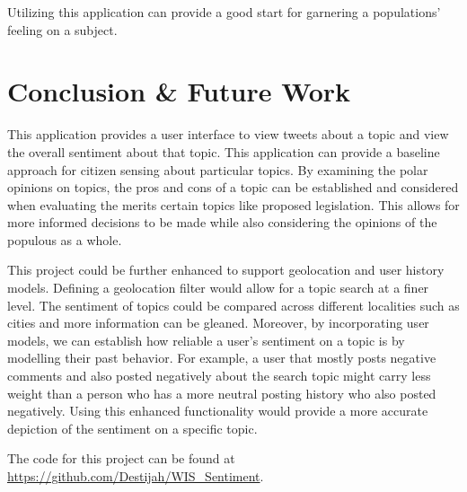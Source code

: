 Utilizing this application can provide a good start for garnering a populations' feeling on a subject. 

\section{Conclusion \& Future Work}
This application provides a user interface to view tweets about a topic and view the overall sentiment about that topic. This application can provide a baseline approach for citizen sensing about particular topics. By examining the polar opinions on topics, the pros and cons of a topic can be established and considered when evaluating the merits certain topics like proposed legislation. This allows for more informed decisions to be made while also considering the opinions of the populous as a whole.

This project could be further enhanced to support geolocation and user history models. Defining a geolocation filter would allow for a topic search at a finer level. The sentiment of topics could be compared across different localities such as cities and more information can be gleaned. Moreover, by incorporating user models, we can establish how reliable a user's sentiment on a topic is by modelling their past behavior. For example, a user that mostly posts negative comments and also posted negatively about the search topic might carry less weight than a person who has a more neutral posting history who also posted negatively. Using this enhanced functionality would provide a more accurate depiction of the sentiment on a specific topic.

The code for this project can be found at \url{https://github.com/Destijah/WIS_Sentiment}.
 

\pagebreak




